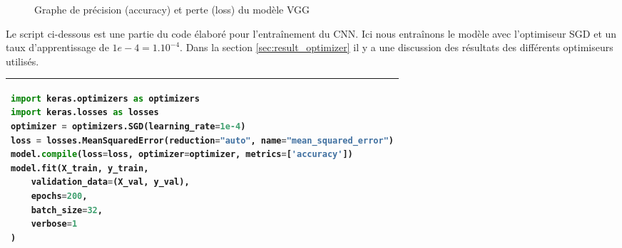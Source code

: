 	\begin{figure}[H]
		\myfloatalign
		 \quad
		
		\caption[]{Graphe de précision (accuracy) et perte (loss) du modèle VGG}\label{fig:adam_curve}
	\end{figure}
	Le script ci-dessous est une partie du code élaboré pour l'entraînement du CNN. Ici nous entraînons le modèle avec l'optimiseur SGD et un taux d'apprentissage de $1e-4 = 1.10^{-4}$. Dans la section \ref{sec:result_optimizer} il y a une discussion des résultats des différents optimiseurs utilisés.
	
\begin{table}[H]
\begin{tabular}{|p{\textwidth}|}
	\hline
	\begin{lstlisting}[language=python]
import keras.optimizers as optimizers
import keras.losses as losses
optimizer = optimizers.SGD(learning_rate=1e-4)
loss = losses.MeanSquaredError(reduction="auto", name="mean_squared_error")
model.compile(loss=loss, optimizer=optimizer, metrics=['accuracy'])
model.fit(X_train, y_train, 
	validation_data=(X_val, y_val), 
	epochs=200, 
	batch_size=32, 
	verbose=1
)
	\end{lstlisting}\\
	\hline
\end{tabular}
\end{table}


